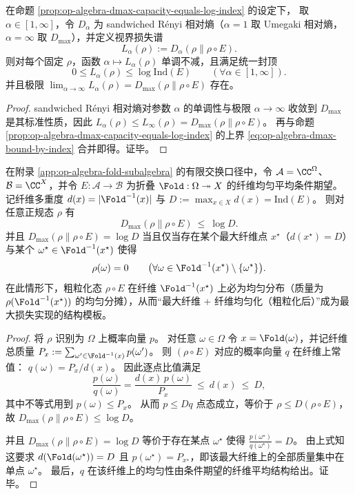 \begin{corollary}\label{cor:op-algebra-renyi-loss-spectrum-capped-by-index}
在命题 \ref{prop:op-algebra-dmax-capacity-equals-log-index} 的设定下，
取 \(\alpha\in[1,\infty]\)，令 \(D_\alpha\) 为 sandwiched Rényi 相对熵（\(\alpha=1\) 取 Umegaki 相对熵，\(\alpha=\infty\) 取 \(D_{\max}\)），并定义视界损失谱
\[
L_\alpha(\rho):=D_\alpha(\rho\|\rho\!\circ\!E).
\]
则对每个固定 \(\rho\)，函数 \(\alpha\mapsto L_\alpha(\rho)\) 单调不减，且满足统一封顶
\[
\boxed{\;
0\le L_\alpha(\rho)\le \log\mathrm{Ind}(E)\qquad(\forall \alpha\in[1,\infty]).\;}
\]
并且极限 \(\lim_{\alpha\to\infty}L_\alpha(\rho)=D_{\max}(\rho\|\rho\!\circ\!E)\) 存在。
\end{corollary}
\begin{proof}
sandwiched Rényi 相对熵对参数 \(\alpha\) 的单调性与极限 \(\alpha\to\infty\) 收敛到 \(D_{\max}\) 是其标准性质，因此
\(
L_\alpha(\rho)\le L_\infty(\rho)=D_{\max}(\rho\|\rho\!\circ\!E)
\)。
再与命题 \ref{prop:op-algebra-dmax-capacity-equals-log-index} 的上界 \eqref{eq:op-algebra-dmax-bound-by-index} 合并即得。证毕。
\end{proof}

\begin{corollary}\label{cor:op-algebra-commutative-dmax-extremizers-maxfiber}
在附录 \ref{app:op-algebra-fold-subalgebra} 的有限交换口径中，令 \(\mathcal{A}=\CC^{\Omega}\)、\(\mathcal{B}=\CC^{X}\)，并令 \(E:\mathcal{A}\to\mathcal{B}\) 为折叠 \(\Fold:\Omega\twoheadrightarrow X\) 的纤维均匀平均条件期望。
记纤维多重度 \(d(x)=|\Fold^{-1}(x)|\) 与 \(D:=\max_{x\in X}d(x)=\mathrm{Ind}(E)\)。
则对任意正规态 \(\rho\) 有
\[
D_{\max}(\rho\|\rho\!\circ\!E)\ \le\ \log D.
\]
并且 \(D_{\max}(\rho\|\rho\!\circ\!E)=\log D\) 当且仅当存在某个最大纤维点 \(x^\star\)（\(d(x^\star)=D\)）与某个 \(\omega^\star\in\Fold^{-1}(x^\star)\) 使得
\[
\rho(\omega)=0\qquad\bigl(\forall \omega\in\Fold^{-1}(x^\star)\setminus\{\omega^\star\}\bigr).
\]
在此情形下，粗粒化态 \(\rho\!\circ\!E\) 在纤维 \(\Fold^{-1}(x^\star)\) 上必为均匀分布（质量为 \(\rho(\Fold^{-1}(x^\star))\) 的均匀分摊），从而“最大纤维 + 纤维均匀化（粗粒化后）”成为最大损失实现的结构模板。
\end{corollary}
\begin{proof}
将 \(\rho\) 识别为 \(\Omega\) 上概率向量 \(p\)。
对任意 \(\omega\in\Omega\) 令 \(x=\Fold(\omega)\)，并记纤维总质量 \(P_x:=\sum_{\omega'\in\Fold^{-1}(x)}p(\omega')\)。
则 \((\rho\!\circ\!E)\) 对应的概率向量 \(q\) 在纤维上常值：
\(
q(\omega)=P_x/d(x)
\)。
因此逐点比值满足
\[
\frac{p(\omega)}{q(\omega)}=\frac{d(x)\,p(\omega)}{P_x}\ \le\ d(x)\ \le\ D,
\]
其中不等式用到 \(p(\omega)\le P_x\)。
从而 \(p\le Dq\) 点态成立，等价于 \(\rho\le D(\rho\!\circ\!E)\)，故
\(
D_{\max}(\rho\|\rho\!\circ\!E)\le \log D
\)。
\par
并且 \(D_{\max}(\rho\|\rho\!\circ\!E)=\log D\) 等价于存在某点 \(\omega^\star\) 使得 \(\frac{p(\omega^\star)}{q(\omega^\star)}=D\)。
由上式知这要求 \(d(\Fold(\omega^\star))=D\) 且 \(p(\omega^\star)=P_{x^\star}\)，即该最大纤维上的全部质量集中在单点 \(\omega^\star\)。
最后，\(q\) 在该纤维上的均匀性由条件期望的纤维平均结构给出。证毕。
\end{proof}

